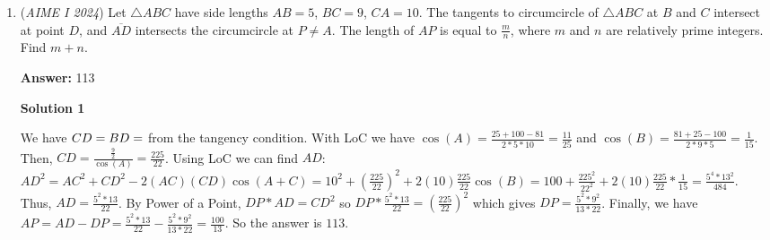 \begin{enumerate}
 
Plugging $y = mx$ into the equation for the hyperbola yields $x^2 = \frac{120}{6-5m^2}$ and $y^2 = \frac{120m^2}{6-5m^2}.$ By symmetry of the hyperbola, we know that $\left(\frac{BD}{2}\right)^2 = x^2 + y^2,$ so we wish to find a lower bound for $x^2 + y^2 = 120\left(\frac{1+m^2}{6-5m^2}\right).$ This is equivalent to minimizing $\frac{1+m^2}{6-5m^2} = -\frac{1}{5} + \frac{11}{5(6-5m^2)}$. It's then easy to see that this expression increases with $m^2,$ so we plug in $m^2 = \frac{5}{6}$ to get $x^2+y^2 > 120,$ giving $BD^2 > \boxed{480}.$




\textbf{Solution 2}

Assume that $AC$ is the asymptote of the hyperbola, in which case $BD$ is minimized. The expression of $BD$ is $y=-\sqrt{\frac{5}{6}}x$. Thus, we could get $\frac{x^2}{20}-\frac{y^2}{24}=1\implies x^2=\frac{720}{11}$. The desired value is $4\cdot \frac{11}{6}x^2=480$. This case can't be achieved, so all $BD^2$ would be greater than $\boxed{480}$



	\item (\textit{AIME I 2024}) Let $\triangle ABC$ have side lengths $AB=5$, $BC=9$, $CA=10$. The tangents to circumcircle of $\triangle ABC$ at $B$ and $C$ intersect at point $D$, and $\overline{AD}$ intersects the circumcircle at $P \neq A$. The length of $AP$ is equal to $\frac{m}{n}$, where $m$ and $n$ are relatively prime integers. Find $m + n$.


 
 \textbf{Answer: }113



\textbf{Solution 1}

We have $\let\angle BCD = \let\angle CBD = \let\angle A$ from the tangency condition. With LoC we have $\cos(A) = \frac{25+100-81}{2*5*10} = \frac{11}{25}$ and $\cos(B) = \frac{81+25-100}{2*9*5} = \frac{1}{15}$. Then, $CD = \frac{\frac{9}{2}}{\cos(A)} = \frac{225}{22}$. Using LoC we can find $AD$: $AD^2 = AC^2 + CD^2 - 2(AC)(CD)\cos(A+C) = 10^2+(\frac{225}{22})^2 + 2(10)\frac{225}{22}\cos(B) = 100 + \frac{225^2}{22^2} + 2(10)\frac{225}{22}*\frac{1}{15} = \frac{5^4*13^2}{484}$. Thus, $AD = \frac{5^2*13}{22}$. By Power of a Point, $DP*AD = CD^2$ so $DP*\frac{5^2*13}{22} = (\frac{225}{22})^2$ which gives $DP = \frac{5^2*9^2}{13*22}$. Finally, we have $AP = AD - DP = \frac{5^2*13}{22} - \frac{5^2*9^2}{13*22} = \frac{100}{13}$. So the answer is $\boxed{113}$.

 




\end{enumerate}
